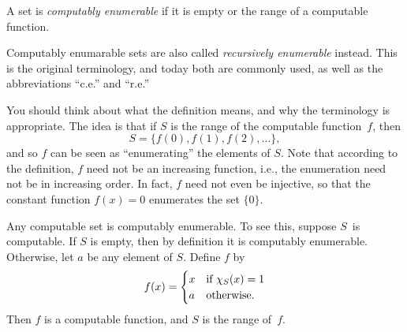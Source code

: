 \documentclass[../../../include/open-logic-section]{subfiles}
\begin{document}

\begin{defn}
A set is \emph{computably enumerable} if it is empty or the range of a
computable function.
\end{defn}

\begin{history}
Computably enumarable sets are also called \emph{recursively
  enumerable} instead. This is the original terminology, and today
both are commonly used, as well as the abbreviations ``c.e.'' and
``r.e.''
\end{history}

\begin{explain}
You should think about what the definition means, and why the
terminology is appropriate. The idea is that if $S$ is the range of
the computable function~$f$, then
\[
S = \{ f(0), f(1), f(2), \dots \},
\]
and so $f$ can be seen as ``enumerating'' the elements of $S$. Note
that according to the definition, $f$ need not be an increasing
function, i.e., the enumeration need not be in increasing order. In
fact, $f$ need not even be injective, so that the constant function
$f(x) = 0$ enumerates the set $\{ 0 \}$.
\end{explain}

Any computable set is computably enumerable. To see this, suppose
$S$~is computable. If $S$ is empty, then by definition it is
computably enumerable. Otherwise, let $a$ be any element of
$S$. Define $f$ by
\[
f(x) =
\begin{cases}
x & \text{if $\Char{S}(x) = 1$} \\
a & \text{otherwise.}
\end{cases}
\]
Then $f$ is a computable function, and $S$ is the range of~$f$.
\end{document}

